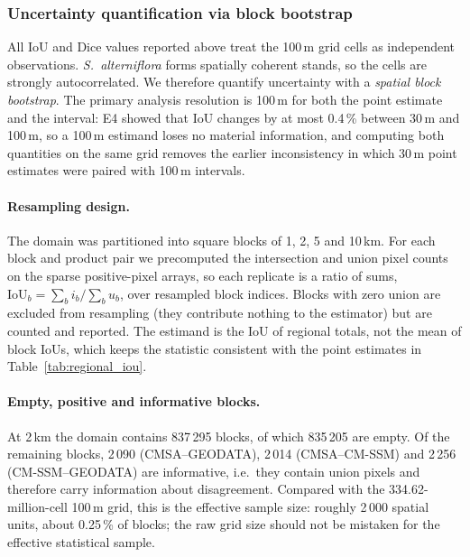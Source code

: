 \documentclass[11pt]{article}
\begin{document}
\subsubsection{Uncertainty quantification via block bootstrap}
\label{sec:bootstrap}

All IoU and Dice values reported above treat the 100\,m grid cells as
independent observations. \textit{S.~alterniflora} forms spatially coherent
stands, so the cells are strongly autocorrelated. We therefore quantify
uncertainty with a \emph{spatial block bootstrap}. The primary analysis
resolution is 100\,m for both the point estimate and the interval: E4 showed
that IoU changes by at most 0.4\,\% between 30\,m and 100\,m, so a 100\,m
estimand loses no material information, and computing both quantities on the
same grid removes the earlier inconsistency in which 30\,m point estimates
were paired with 100\,m intervals.

\paragraph{Resampling design.}
The domain was partitioned into square blocks of 1, 2, 5 and 10\,km. For each
block and product pair we precomputed the intersection and union pixel counts
on the sparse positive-pixel arrays, so each replicate is a ratio of sums,
$\mathrm{IoU}_b=\sum_b i_b/\sum_b u_b$, over resampled block indices. Blocks
with zero union are excluded from resampling (they contribute nothing to the
estimator) but are counted and reported. The estimand is the IoU of regional
totals, not the mean of block IoUs, which keeps the statistic consistent with
the point estimates in Table~\ref{tab:regional_iou}.

\paragraph{Empty, positive and informative blocks.}
At 2\,km the domain contains 837\,295 blocks, of which 835\,205 are empty. Of
the remaining blocks, 2\,090 (CMSA--GEODATA), 2\,014 (CMSA--CM-SSM) and 2\,256
(CM-SSM--GEODATA) are informative, i.e.\ they contain union pixels and
therefore carry information about disagreement. Compared with the
334.62-million-cell 100\,m grid, this is the effective sample size: roughly
2\,000 spatial units, about 0.25\,\% of blocks; the raw grid size should not
be mistaken for the effective statistical sample.
\end{document}
